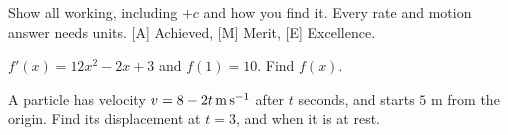 \documentclass[11pt]{article}
\begin{document}
Show all working, including $+c$ and how you find it. Every rate and motion answer needs units. [A] Achieved, [M] Merit, [E] Excellence.

\Q $f'(x)=12x^{2}-2x+3$ and $f(1)=10$. Find $f(x)$.

\Q A particle has velocity $v=8-2t\,\mathrm{m\,s^{-1}}$ after $t$ seconds, and starts $5$ m from the origin. Find its displacement at $t=3$, and when it is at rest.






\end{document}
